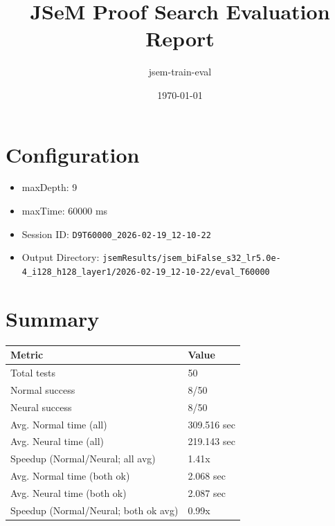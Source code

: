\documentclass[a4paper,10pt]{article}
\title{JSeM Proof Search Evaluation Report}
\author{jsem-train-eval}
\date{\today}
\begin{document}
\maketitle

\section{Configuration}
\begin{itemize}
\item maxDepth: 9
\item maxTime: 60000 ms
\item Session ID: \texttt{D9T60000\_2026-02-19\_12-10-22}
\item Output Directory: \texttt{jsemResults/jsem\_biFalse\_s32\_lr5.0e-4\_i128\_h128\_layer1/2026-02-19\_12-10-22/eval\_T60000}
\end{itemize}

\section{Summary}
\begin{tabular}{ll}
\toprule
\textbf{Metric} & \textbf{Value} \\
\midrule
Total tests & 50 \\
Normal success & 8/50 \\
Neural success & 8/50 \\
\midrule
Avg. Normal time (all) & 309.516 sec \\
Avg. Neural time (all) & 219.143 sec \\
Speedup (Normal/Neural; all avg) & 1.41x \\
Avg. Normal time (both ok) & 2.068 sec \\
Avg. Neural time (both ok) & 2.087 sec \\
Speedup (Normal/Neural; both ok avg) & 0.99x \\
\bottomrule
\end{tabular}
\end{document}

